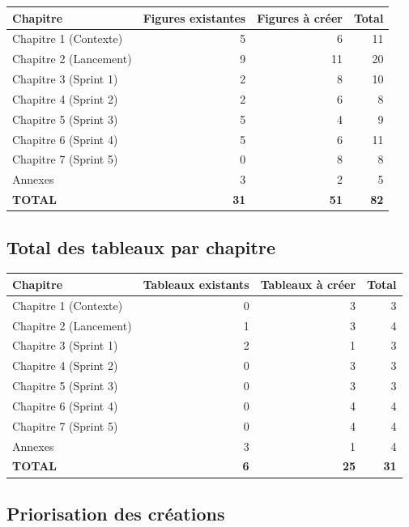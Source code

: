 \documentclass[12pt,a4paper]{article}
\begin{document}
\begin{longtable}{p{4cm} r r r}
    \textbf{Chapitre} & \textbf{Figures existantes} & \textbf{Figures à créer} & \textbf{Total} \\
    \midrule
    \endhead
    
    Chapitre 1 (Contexte) & 5 & 6 & 11 \\
    Chapitre 2 (Lancement) & 9 & 11 & 20 \\
    Chapitre 3 (Sprint 1) & 2 & 8 & 10 \\
    Chapitre 4 (Sprint 2) & 2 & 6 & 8 \\
    Chapitre 5 (Sprint 3) & 5 & 4 & 9 \\
    Chapitre 6 (Sprint 4) & 5 & 6 & 11 \\
    Chapitre 7 (Sprint 5) & 0 & 8 & 8 \\
    Annexes & 3 & 2 & 5 \\
    \midrule
    \textbf{TOTAL} & \textbf{31} & \textbf{51} & \textbf{82} \\
    \bottomrule
\end{longtable}

\subsection*{Total des tableaux par chapitre}

\begin{longtable}{p{4cm} r r r}
    \textbf{Chapitre} & \textbf{Tableaux existants} & \textbf{Tableaux à créer} & \textbf{Total} \\
    \midrule
    \endhead
    
    Chapitre 1 (Contexte) & 0 & 3 & 3 \\
    Chapitre 2 (Lancement) & 1 & 3 & 4 \\
    Chapitre 3 (Sprint 1) & 2 & 1 & 3 \\
    Chapitre 4 (Sprint 2) & 0 & 3 & 3 \\
    Chapitre 5 (Sprint 3) & 0 & 3 & 3 \\
    Chapitre 6 (Sprint 4) & 0 & 4 & 4 \\
    Chapitre 7 (Sprint 5) & 0 & 4 & 4 \\
    Annexes & 3 & 1 & 4 \\
    \midrule
    \textbf{TOTAL} & \textbf{6} & \textbf{25} & \textbf{31} \\
    \bottomrule
\end{longtable}

\subsection*{Priorisation des créations}
\end{document}
